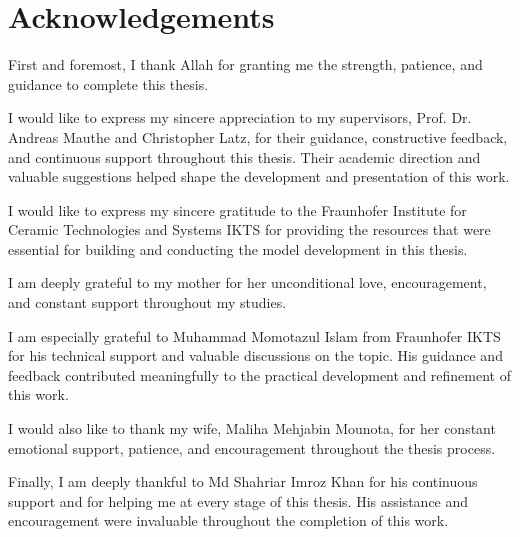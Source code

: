 
\chapter*{Acknowledgements}

First and foremost, I thank Allah for granting me the strength, patience,
and guidance to complete this thesis.

I would like to express my sincere appreciation to my supervisors, Prof. Dr.
Andreas Mauthe and Christopher Latz, for their guidance, constructive feedback,
and continuous support throughout this thesis. Their academic direction and
valuable suggestions helped shape the development and presentation of this work.

I would like to express my sincere gratitude to the Fraunhofer Institute for
Ceramic Technologies and Systems IKTS for providing the resources that were
essential for building and conducting the model development in this thesis.

I am deeply grateful to my mother for her unconditional love,
encouragement, and constant support throughout my studies.

I am especially grateful to Muhammad Momotazul Islam from Fraunhofer IKTS for
his technical support and valuable discussions on the topic. His guidance and
feedback contributed meaningfully to the practical development and refinement of
this work.

I would also like to thank my wife, Maliha Mehjabin Mounota, for her constant
emotional support, patience, and encouragement throughout the thesis process.

Finally, I am deeply thankful to Md Shahriar Imroz Khan for his continuous
support and for helping me at every stage of this thesis. His assistance and
encouragement were invaluable throughout the completion of this work.
